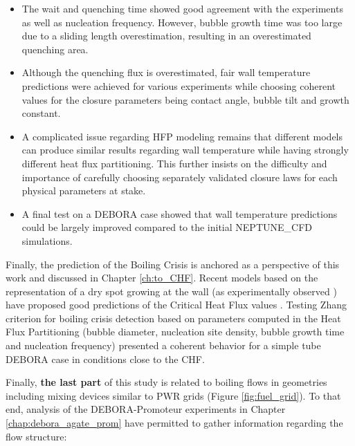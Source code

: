 \begin{itemize}
\item The wait and quenching time showed good agreement with the experiments as well as nucleation frequency. However, bubble growth time was too large due to a sliding length overestimation, resulting in an overestimated quenching area.
\item Although the quenching flux is overestimated, fair wall temperature predictions were achieved for various experiments while choosing coherent values for the closure parameters being contact angle, bubble tilt and growth constant.

\item A complicated issue regarding HFP modeling remains that different models can produce similar results regarding wall temperature while having strongly different heat flux partitioning. This further insists on the difficulty and importance of carefully choosing separately validated closure laws for each physical parameters at stake.

\item A final test on a DEBORA case showed that wall temperature predictions could be largely improved compared to the initial NEPTUNE\_CFD simulations.
\end{itemize}

Finally, the prediction of the Boiling Crisis is anchored as a perspective of this work and discussed in Chapter \ref{ch:to_CHF}. Recent models based on the representation of a dry spot growing at the wall (as experimentally observed \cite{kossolapov_experimental_2021, richenderfer_experimental_2018}) have proposed good predictions of the Critical Heat Flux values \cite{zhang_new_2022, demarly_new_2020}. Testing Zhang criterion for boiling crisis detection \cite{zhang_new_2022} based on parameters computed in the Heat Flux Partitioning (bubble diameter, nucleation site density, bubble growth time and nucleation frequency) presented a coherent behavior for a simple tube DEBORA case in conditions close to the CHF.

\npar

Finally, \textbf{the last part} of this study is related to boiling flows in geometries including mixing devices similar to PWR grids (Figure \ref{fig:fuel_grid}). To that end, analysis of the DEBORA-Promoteur experiments in Chapter \ref{chap:debora_agate_prom} have permitted to gather information regarding the flow structure:

